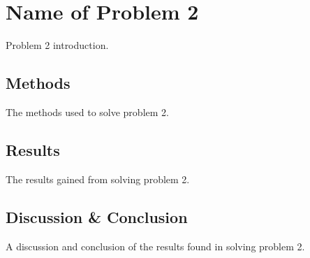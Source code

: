 \chapter{Name of Problem 2}\label{ch:1-tactile-perception}
Problem 2 introduction.

\section{Methods}\label{sec:1-tactile-perception-method}

The methods used to solve problem 2.

\section{Results}\label{sec:1-tactile-perception-results}

The results gained from solving problem 2.

\section{Discussion \& Conclusion}\label{sec:1-tactile-perception-discussion-and-conclusion}

A discussion and conclusion of the results found in solving problem 2.
